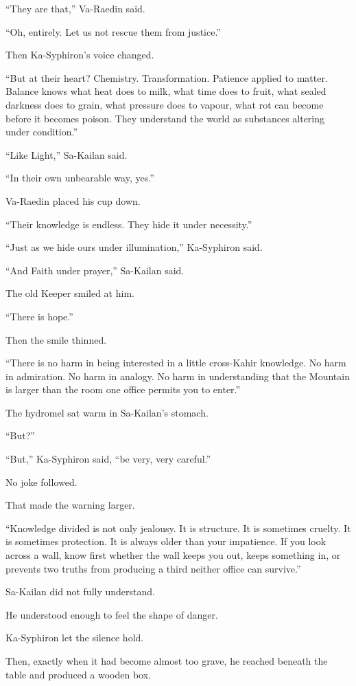 “They are that,” Va-Raedin said.\par
“Oh, entirely. Let us not rescue them from justice.”\par
Then Ka-Syphiron’s voice changed.\par
“But at their heart? Chemistry. Transformation. Patience applied to matter. Balance knows what heat does to milk, what time does to fruit, what sealed darkness does to grain, what pressure does to vapour, what rot can become before it becomes poison. They understand the world as substances altering under condition.”\par
“Like Light,” Sa-Kailan said.\par
“In their own unbearable way, yes.”\par
Va-Raedin placed his cup down.\par
“Their knowledge is endless. They hide it under necessity.”\par
“Just as we hide ours under illumination,” Ka-Syphiron said.\par
“And Faith under prayer,” Sa-Kailan said.\par
The old Keeper smiled at him.\par
“There is hope.”\par
Then the smile thinned.\par
“There is no harm in being interested in a little cross-Kahir knowledge. No harm in admiration. No harm in analogy. No harm in understanding that the Mountain is larger than the room one office permits you to enter.”\par
The hydromel sat warm in Sa-Kailan’s stomach.\par
“But?”\par
“But,” Ka-Syphiron said, “be very, very careful.”\par
No joke followed.\par
That made the warning larger.\par
“Knowledge divided is not only jealousy. It is structure. It is sometimes cruelty. It is sometimes protection. It is always older than your impatience. If you look across a wall, know first whether the wall keeps you out, keeps something in, or prevents two truths from producing a third neither office can survive.”\par
Sa-Kailan did not fully understand.\par
He understood enough to feel the shape of danger.\par
Ka-Syphiron let the silence hold.\par
Then, exactly when it had become almost too grave, he reached beneath the table and produced a wooden box.\par
